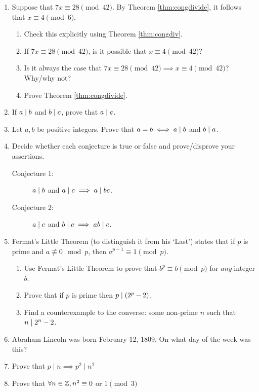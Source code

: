 \begin{exercises}{}{}
\begin{enumerate}
  \item\label{exs:congdivide} Suppose that $7x\equiv 28\pmod{42}$. By Theorem \ref{thm:congdivide}, it follows that $x\equiv 4\pmod{6}$.
  \begin{enumerate}
    \item Check this explicitly using Theorem \ref{thm:congdiv}.
    \item If $7x\equiv 28\pmod{42}$, is it possible that $x\equiv 4\pmod{42}$?
    \item Is it always the case that $7x\equiv 28\pmod{42}\implies x\equiv 4\pmod{42}$? Why/why not?
    \item Prove Theorem \ref{thm:congdivide}.
  \end{enumerate}
  
  \item If $a\mid b$ and $b\mid c$, prove that $a\mid c$.
  
  \item\label{ex:adivb} Let $a,b$ be positive integers. Prove that $a=b\iff a\mid b$ and $b\mid a$.
  
  \item Decide whether each conjecture is true or false and prove/disprove your assertions.
  \begin{description}
    \item[Conjecture 1:] $a\mid b$ and $a\mid c\implies a\mid bc$.
    \item[Conjecture 2:] $a\mid c$ and $b\mid c\implies ab\mid c$.
  \end{description}

	\item Fermat's Little Theorem (to distinguish it from his `Last') states that if $p$ is prime and $a\not\equiv 0\mod p$, then $a^{p-1}\equiv 1\pmod p$.
	\begin{enumerate}
	  \item Use Fermat's Little Theorem to prove that $b^p\equiv b\pmod p$ for \emph{any} integer $b$.
	  \item Prove that if $p$ is prime then $p\mid (2^p-2)$.
	  \item Find a counterexample to the converse: some non-prime $n$ such that $n\mid 2^n-2$.
	\end{enumerate}
	
	\item Abraham Lincoln was born February 12\th, 1809. On what day of the week was this?
	
	\item Prove that $p\mid n\implies p^2\mid n^2$
	
	\item Prove that $\forall n\in\mathbb{Z}, n^2\equiv 0$ or $1\pmod 3$
\end{enumerate}

\end{exercises}

